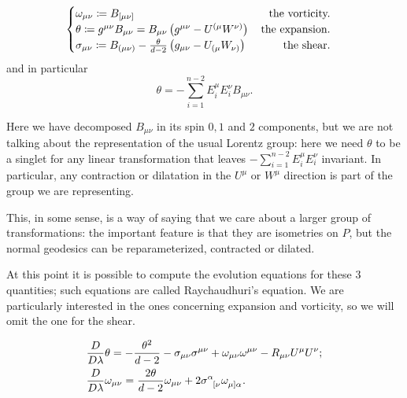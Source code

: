 \begin{equation}
\label{eq:def-expansion-vorticity-shear}
	\begin{cases}
	\omega_{\mu\nu} \coloneqq B_{[\mu\nu]} \hfill \text{the vorticity.} \\
	\theta \coloneqq g^{\mu\nu}B_{\mu\nu}  = B_{\mu\nu} \left(g^{\mu\nu} - U^{(\mu}W^{\nu)}\right) \hfill \quad \text{the expansion.} \\
	\sigma_{\mu\nu} \coloneqq B_{(\mu\nu)} - \frac{\theta}{d - 2}\left(g_{\mu\nu} - U_{(\mu}W_{\nu)}\right) \hfill \quad \text{ the shear.}
	\end{cases}
\end{equation}
and in particular
\[
\theta = - \sum_{i=1}^{n - 2}E_i^{\mu}E_i^{\nu} B_{\mu\nu}.
\]
\begin{remark}
	Here we have decomposed \(B_{\mu\nu}\) in its spin \(0, 1\) and \(2\) components, but we are not talking about the representation of the usual Lorentz group: here we need \(\theta\) to be a singlet for any linear transformation that leaves \(- \sum_{i=1}^{n - 2}E_i^{\mu}E_i^{\nu}\) invariant. In particular, any contraction or dilatation in the \(U^{\mu}\) or \(W^{\mu}\) direction is part of the group we are representing.
		
	This, in some sense, is a way of saying that we care about a larger group of transformations: the important feature is that they are isometries on \(P\), but the normal geodesics can be reparameterized, contracted or dilated.
\end{remark}
	
At this point it is possible to compute the evolution equations for these \(3\) quantities; such equations are called Raychaudhuri's equation.
We are particularly interested in the ones concerning expansion and vorticity, so we will omit the one for the shear.
	
\begin{align}
	\label{eq:Raychaudhuri-theta}
	&\frac{D}{D\lambda}\theta = -\frac{\theta^2}{d - 2} - \sigma_{\mu\nu}\sigma^{\mu\nu} + \omega_{\mu\nu}\omega^{\mu\nu}  - R_{\mu\nu}U^{\mu}U^{\nu}; \\
	\label{eq:Raychaudhuri-vorticity}
	&\frac{D}{D\lambda}\omega_{\mu\nu} = \frac{2\theta}{d - 2}\omega_{\mu\nu} + 2\sigma\indices{^{\alpha}_{[\nu}}\omega\indices{_{\mu]\alpha}}.
\end{align}
	
